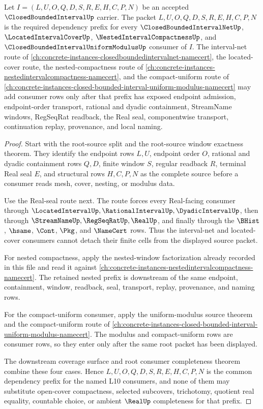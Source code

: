 \begin{theorem}
\label{thm:closed-bounded-interval-root-source-dependency-scope}
Let $I=(L,U,O,Q,D,S,R,E,H,C,P,N)$ be an accepted $\ClosedBoundedIntervalUp$ carrier. The packet $L,U,O,Q,D,S,R,E,H,C,P,N$ is the required dependency prefix for every $\ClosedBoundedIntervalNetUp$, $\LocatedIntervalCoverUp$, $\NestedIntervalCompactnessUp$, and $\ClosedBoundedIntervalUniformModulusUp$ consumer of $I$. The interval-net route of \autoref{ch:concrete-instances-closedboundedintervalnet-namecert}, the located-cover route, the nested-compactness route of \autoref{ch:concrete-instances-nestedintervalcompactness-namecert}, and the compact-uniform route of \autoref{ch:concrete-instances-closed-bounded-interval-uniform-modulus-namecert} may add consumer rows only after that prefix has exposed endpoint admission, endpoint-order transport, rational and dyadic containment, StreamName windows, RegSeqRat readback, the Real seal, componentwise transport, continuation replay, provenance, and local naming.
\end{theorem}
\begin{proof}
Start with the root-source split and the root-source window exactness theorem. They identify the endpoint rows $L,U$, endpoint order $O$, rational and dyadic containment rows $Q,D$, finite window $S$, regular readback $R$, terminal Real seal $E$, and structural rows $H,C,P,N$ as the complete source before a consumer reads mesh, cover, nesting, or modulus data.

Use the Real-seal route next. The route forces every Real-facing consumer through $\LocatedIntervalUp,\RationalIntervalUp,\DyadicIntervalUp$, then through $\StreamNameUp,\RegSeqRatUp,\RealUp$, and finally through the $\BHist$, $\hsame$, $\Cont$, $\Pkg$, and $\NameCert$ rows. Thus the interval-net and located-cover consumers cannot detach their finite cells from the displayed source packet.

For nested compactness, apply the nested-window factorization already recorded in this file and read it against \autoref{ch:concrete-instances-nestedintervalcompactness-namecert}. The retained nested prefix is downstream of the same endpoint, containment, window, readback, seal, transport, replay, provenance, and naming rows.

For the compact-uniform consumer, apply the uniform-modulus source theorem and the compact-uniform route of \autoref{ch:concrete-instances-closed-bounded-interval-uniform-modulus-namecert}. The modulus and compact-uniform rows are consumer rows, so they enter only after the same root packet has been displayed.

The downstream coverage surface and root consumer completeness theorem combine these four cases. Hence $L,U,O,Q,D,S,R,E,H,C,P,N$ is the common dependency prefix for the named L10 consumers, and none of them may substitute open-cover compactness, selected subcovers, trichotomy, quotient real equality, countable choice, or ambient $\RealUp$ completeness for that prefix.
\end{proof}

